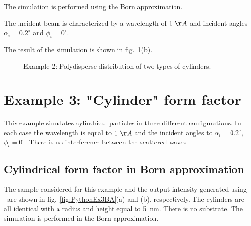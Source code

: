 The simulation is performed using the Born approximation.

The incident beam is characterized by a wavelength of $1~\AA$ and incident angles
$\alpha_i=0.2^{\circ}$ and $\phi_i=0^{\circ}$.

The result of the simulation is shown in fig.~\ref{fig:PythonEx2}(b). 


\begin{figure}[H]
\hfill
{}
\hfill
{}
\hfill
\caption{Example 2: Polydisperse distribution of two types of cylinders.}
\label{fig:PythonEx2}
\end{figure}


\newpage
\section{Example 3: "Cylinder" form factor}
This example simulates cylindrical particles in three different configurations.
In each case the wavelength is equal to $1~\AA$ and the incident angles to $\alpha_i=0.2^{\circ}$, $\phi_i=0^{\circ}$. There is no interference between the scattered waves.

\subsection{Cylindrical form factor in Born approximation} \label{sec:ex003CylinderBA}
The sample considered for this example and the output intensity generated using \BornAgain\ are shown in fig.~\ref{fig:PythonEx3BA}(a) and (b), respectively. The cylinders are all identical with a radius and height equal to 5~nm. There is no substrate. The simulation is performed in the Born approximation.

